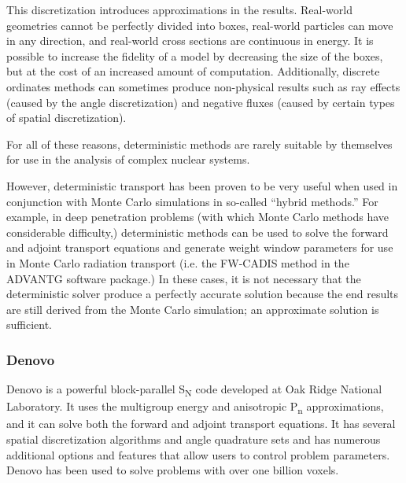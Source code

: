 This discretization introduces approximations in the results.
Real-world geometries cannot be perfectly divided into boxes, real-world particles can move in any direction, and real-world cross sections are continuous in energy.
It is possible to increase the fidelity of a model by decreasing the size of the boxes, but at the cost of an increased amount of computation.
Additionally, discrete ordinates methods can sometimes produce non-physical results such as ray effects (caused by the angle discretization) and negative fluxes (caused by certain types of spatial discretization).

For all of these reasons, deterministic methods are rarely suitable by themselves for use in the analysis of complex nuclear systems.

However, deterministic transport has been proven to be very useful when used in conjunction with Monte Carlo simulations in so-called ``hybrid methods.''
For example, in deep penetration problems (with which Monte Carlo methods have considerable difficulty,) deterministic methods can be used to solve the forward and adjoint transport equations and generate weight window parameters for use in Monte Carlo radiation transport (i.e. the FW-CADIS method \cite{fwcadis} in the ADVANTG \cite{advantg} software package.)
In these cases, it is not necessary that the deterministic solver produce a perfectly accurate solution because the end results are still derived from the Monte Carlo simulation; an approximate solution is sufficient.

\subsubsection{Denovo}
\label{sec:bg:rt:determ:denovo}

Denovo \cite{denovo} is a powerful block-parallel S\textsubscript{N} code developed at Oak Ridge National Laboratory.
It uses the multigroup energy and anisotropic P\textsubscript{n} approximations, and it can solve both the forward and adjoint transport equations.
It has several spatial discretization algorithms and angle quadrature sets and has numerous additional options and features that allow users to control problem parameters.
Denovo has been used to solve problems with over one billion voxels.

